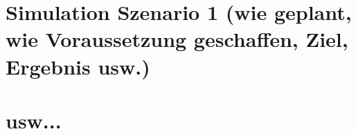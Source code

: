 \section{Simulation Szenario 1 (wie geplant, wie Voraussetzung geschaffen, Ziel, Ergebnis usw.)}
\section{usw...}